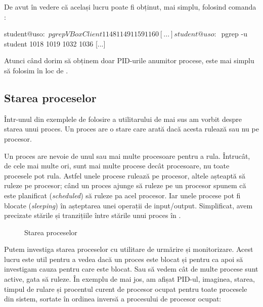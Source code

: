 De avut în vedere că același lucru poate fi obținut, mai simplu, folosind
comanda :

\begin{screen}
student@uso:~$ pgrep VBoxClient
1148
1149
1159
1160
[...]
student@uso:~$ pgrep -u student
1018
1019
1032
1036
[...]
\end{screen}

Atunci când dorim să obținem doar PID-urile anumitor procese, este mai simplu să
folosim  în loc de .

\subsection{Starea proceselor}
\label{sec:procese-resurse-stare}

Într-unul din exemplele de folosire a utilitarului  de mai sus am vorbit
despre starea unui proces. Un proces are o stare care arată dacă acesta rulează
sau nu pe procesor.

Un proces are nevoie de unul sau mai multe procesoare pentru a rula. Întrucât,
de cele mai multe ori, sunt mai multe procese decât procesoare, nu toate
procesele pot rula. Astfel unele procese rulează pe procesor, altele așteaptă să
ruleze pe procesor; când un proces ajunge să ruleze pe un procesor spunem că
este planificat (\textit{scheduled}) să ruleze pa acel procesor. Iar unele
procese pot fi blocate (\textit{sleeping}) în așteptarea unei operații de
input/output. Simplificat, avem precizate stările și tranzițiile între stările unui proces în .

\begin{figure}[!htbp]
	\centering
	\def\svgwidth{0.8\textwidth}
	
	\caption{Starea proceselor}
	\label{fig:process-state}
\end{figure}

Putem investiga starea proceselor cu utilitare de urmărire și monitorizare.
Acest lucru este util pentru a vedea dacă un proces este blocat și pentru ca
apoi să investigam cauza pentru care este blocat. Sau să vedem cât de multe
procese sunt active, gata să ruleze. În exemplu de mai jos, am afișat PID-ul,
imaginea, starea, timpul de rulare și procentul curent de procesor ocupat pentru
toate procesele din sistem, sortate în ordinea inversă a procesului de procesor ocupat:


